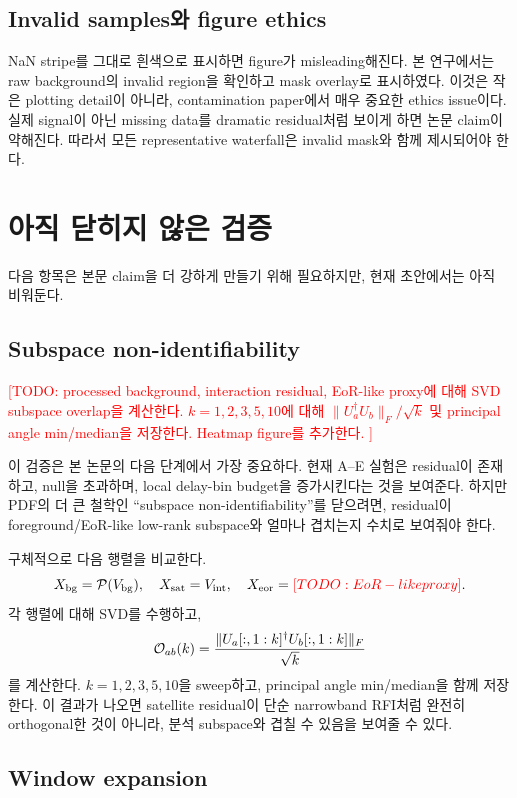 \documentclass[11pt,a4paper]{article}
\newcommand{\todo}[1]{\textcolor{red}{[TODO: #1]}}
\newcommand{\vis}{V}
\begin{document}
\subsection{Invalid samples와 figure ethics}

NaN stripe를 그대로 흰색으로 표시하면 figure가 misleading해진다.
본 연구에서는 raw background의 invalid region을 확인하고 mask overlay로 표시하였다.
이것은 작은 plotting detail이 아니라, contamination paper에서 매우 중요한 ethics issue이다.
실제 signal이 아닌 missing data를 dramatic residual처럼 보이게 하면 논문 claim이 약해진다.
따라서 모든 representative waterfall은 invalid mask와 함께 제시되어야 한다.

\section{아직 닫히지 않은 검증}
\label{sec:future}

다음 항목은 본문 claim을 더 강하게 만들기 위해 필요하지만, 현재 초안에서는 아직 비워둔다.

\subsection{Subspace non-identifiability}

\todo{
processed background, interaction residual, EoR-like proxy에 대해 SVD subspace overlap을 계산한다.
$k=1,2,3,5,10$에 대해
$\|U_a^\dagger U_b\|_F/\sqrt{k}$ 및 principal angle min/median을 저장한다.
Heatmap figure를 추가한다.
}

이 검증은 본 논문의 다음 단계에서 가장 중요하다.
현재 A--E 실험은 residual이 존재하고, null을 초과하며, local delay-bin budget을 증가시킨다는 것을 보여준다.
하지만 PDF의 더 큰 철학인 ``subspace non-identifiability''를 닫으려면, residual이 foreground/EoR-like low-rank subspace와 얼마나 겹치는지 수치로 보여줘야 한다.

구체적으로 다음 행렬을 비교한다.
\[
  X_{\rm bg}={\cal P}(\vis_{\rm bg}),\quad
  X_{\rm sat}=\vis_{\rm int},\quad
  X_{\rm eor}=\todo{EoR-like proxy}.
\]
각 행렬에 대해 SVD를 수행하고,
\[
  {\cal O}_{ab}(k)
  =
  \frac{\|U_a[:,1:k]^\dagger U_b[:,1:k]\|_F}{\sqrt{k}}
\]
를 계산한다.
$k=1,2,3,5,10$을 sweep하고, principal angle min/median을 함께 저장한다.
이 결과가 나오면 satellite residual이 단순 narrowband RFI처럼 완전히 orthogonal한 것이 아니라, 분석 subspace와 겹칠 수 있음을 보여줄 수 있다.

\subsection{Window expansion}
\end{document}
